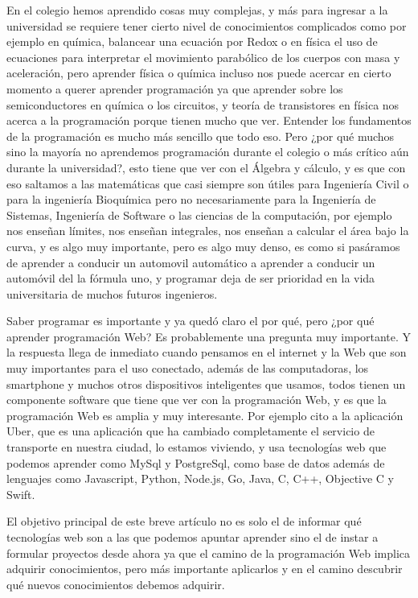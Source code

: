\documentclass[a4paper]{article}
\begin{document}
En el colegio hemos aprendido cosas muy complejas, y más para ingresar a la
universidad se requiere tener cierto nivel de conocimientos complicados como
por ejemplo en química, balancear una ecuación por Redox o en física el uso de
ecuaciones para interpretar el movimiento parabólico de los cuerpos con masa y
aceleración, pero aprender física o química incluso nos puede acercar en cierto
momento a querer aprender programación ya que aprender sobre los
semiconductores en química o los circuitos, y teoría de transistores en física
nos acerca a la programación porque tienen mucho que ver. Entender los
fundamentos de la programación es mucho más sencillo
que todo eso. Pero ¿por qué muchos sino la mayoría no aprendemos programación
durante el colegio o más crítico aún durante la universidad?, esto tiene que
ver con el Álgebra y cálculo, y es que con eso saltamos a las matemáticas que
casi siempre son útiles para Ingeniería Civil o para la ingeniería Bioquímica
pero no necesariamente para la Ingeniería de Sistemas, Ingeniería de Software o
las ciencias de la computación, por ejemplo nos enseñan límites, nos enseñan
integrales, nos enseñan a calcular el área bajo la curva, y es algo muy
importante, pero es algo muy denso, es como si pasáramos de aprender a conducir
un automovil automático a aprender a conducir un automóvil del la fórmula uno,
y programar deja de ser prioridad en la vida universitaria de muchos futuros
ingenieros.

Saber programar es importante y ya quedó claro el por qué, pero ¿por qué
aprender programación Web? Es probablemente una pregunta muy importante.
Y la respuesta llega de inmediato cuando pensamos en el internet y la Web que
son muy importantes para el uso conectado, además de las computadoras, los
smartphone y muchos otros dispositivos inteligentes que usamos, todos tienen un
componente software que tiene que ver con la programación Web, y es que la
programación Web es amplia y muy interesante. Por ejemplo cito a la aplicación
Uber, que es una aplicación que ha cambiado completamente el servicio de
transporte en nuestra ciudad, lo estamos viviendo, y usa tecnologías web que
podemos aprender como MySql y PostgreSql, como base de datos además de
lenguajes como Javascript, Python, Node.js, Go, Java, C, C++, Objective C y
Swift.

El objetivo principal de este breve artículo no es solo el de informar qué
tecnologías web son a las que podemos apuntar aprender sino el de instar a
formular proyectos desde ahora ya que el camino de la programación Web implica
adquirir conocimientos, pero más importante aplicarlos y en el camino descubrir
qué nuevos conocimientos debemos adquirir.
\end{document}
